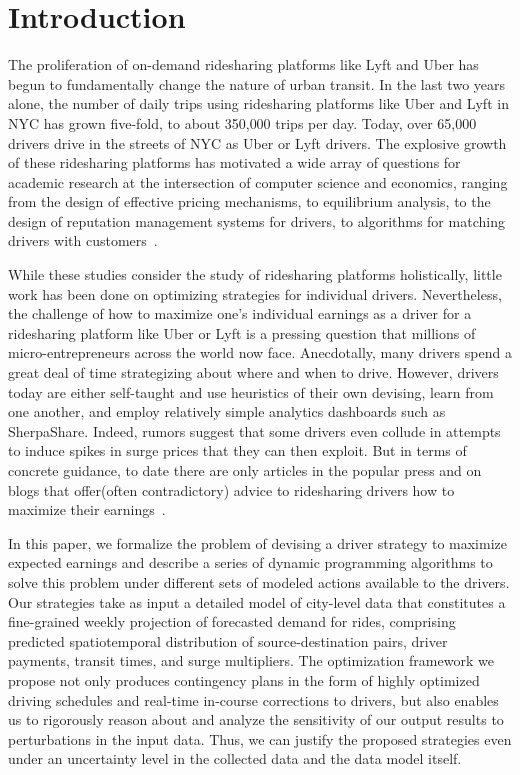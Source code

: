 
\section{Introduction}
\label{sec:introduction}

The proliferation of on-demand ridesharing platforms like Lyft and Uber
  has begun to fundamentally change the nature of urban transit. 
In the last two years alone, the number of daily trips using ridesharing 
  platforms like Uber and Lyft in NYC has grown five-fold, 
  to about 350,000 trips per day. 
Today, over 65,000 drivers drive in the streets of NYC as Uber or Lyft drivers.
The explosive growth of these ridesharing platforms has motivated a wide
  array of questions for academic research at the intersection of computer
  science and economics, ranging from the design of effective pricing mechanisms, 
  to equilibrium analysis, to the design of reputation management systems for 
  drivers, to algorithms for matching drivers with 
  customers~\cite{banerjee2015pricing,ozkan2016dynamic}.

While these studies consider the study of ridesharing platforms holistically, 
   little work has been done on optimizing strategies for individual drivers. 
Nevertheless, the challenge of how to maximize one's individual earnings as a driver for a 
ridesharing platform like Uber or Lyft is a pressing question that millions of micro-entrepreneurs 
across the world now face.  Anecdotally, many drivers spend a great deal of time 
strategizing about where and when to drive.  However, drivers today are either
self-taught and use heuristics of their own devising, learn from one another, 
and employ relatively simple analytics dashboards such as SherpaShare.
Indeed, rumors suggest that some drivers even collude in attempts to induce spikes in surge prices that they can then exploit.
But in terms of concrete guidance, to date there are only articles in the
  popular press and on blogs that offer(often contradictory) advice to ridesharing drivers 
  how to maximize their earnings~\cite{dont,tips,sherpashareNYT}.

In this paper, we formalize the problem of devising a driver strategy to maximize expected 
 earnings and describe a series of dynamic programming algorithms to solve this problem
 under different sets of modeled actions available to the drivers. 
Our strategies take as input a detailed model of city-level data that constitutes a 
  fine-grained weekly projection of forecasted demand for rides, comprising 
  predicted spatiotemporal distribution of source-destination pairs, driver payments,
  transit times, and surge multipliers. 
The optimization framework we propose not only produces contingency plans in the form of
  highly optimized driving schedules and real-time in-course corrections to drivers, but 
  also enables us to rigorously reason about and analyze the sensitivity of our output 
  results to perturbations in the input data.  
Thus, we can justify the proposed strategies even under an uncertainty level in the
  collected data and the data model itself.
  
